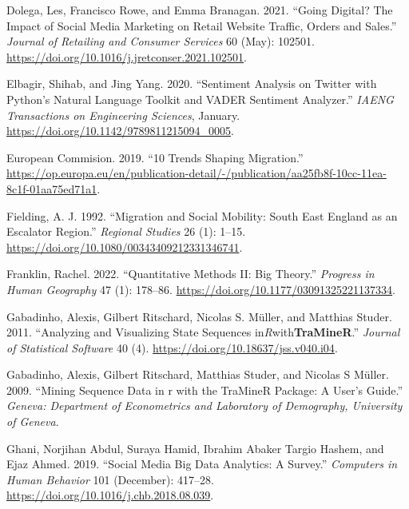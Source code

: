 \documentclass[
  letterpaper,
  DIV=11,
  numbers=noendperiod]{scrreprt}
\newlength{\cslhangindent}
\newlength{\cslentryspacingunit} %
\newenvironment{CSLReferences}[2] %
 {%
  \setlength{\parindent}{0pt}
  \ifodd #1
  \let\oldpar\par
  \def\par{\hangindent=\cslhangindent\oldpar}
  \fi
  \setlength{\parskip}{#2\cslentryspacingunit}
 }%
 {}
\begin{document}
\begin{CSLReferences}{1}{0}
\leavevmode{}%
Dolega, Les, Francisco Rowe, and Emma Branagan. 2021. {``Going Digital?
The Impact of Social Media Marketing on Retail Website Traffic, Orders
and Sales.''} \emph{Journal of Retailing and Consumer Services} 60
(May): 102501. \url{https://doi.org/10.1016/j.jretconser.2021.102501}.

\leavevmode{}%
Elbagir, Shihab, and Jing Yang. 2020. {``Sentiment Analysis on Twitter
with Python{'}s Natural Language Toolkit and VADER Sentiment
Analyzer.''} \emph{IAENG Transactions on Engineering Sciences}, January.
\url{https://doi.org/10.1142/9789811215094_0005}.

\leavevmode{}%
European Commision. 2019. {``{10 Trends Shaping Migration}.''}
\url{https://op.europa.eu/en/publication-detail/-/publication/aa25fb8f-10cc-11ea-8c1f-01aa75ed71a1}.

\leavevmode{}%
Fielding, A. J. 1992. {``Migration and Social Mobility: South East
England as an Escalator Region.''} \emph{Regional Studies} 26 (1):
1--15. \url{https://doi.org/10.1080/00343409212331346741}.

\leavevmode{}%
Franklin, Rachel. 2022. {``Quantitative Methods II: Big Theory.''}
\emph{Progress in Human Geography} 47 (1): 178--86.
\url{https://doi.org/10.1177/03091325221137334}.

\leavevmode{}%
Gabadinho, Alexis, Gilbert Ritschard, Nicolas S. Müller, and Matthias
Studer. 2011. {``Analyzing and Visualizing State Sequences
in{\emph{R}}with{\textbf{TraMineR}}.''} \emph{Journal of Statistical
Software} 40 (4). \url{https://doi.org/10.18637/jss.v040.i04}.

\leavevmode{}%
Gabadinho, Alexis, Gilbert Ritschard, Matthias Studer, and Nicolas S
Müller. 2009. {``Mining Sequence Data in r with the TraMineR Package: A
User's Guide.''} \emph{Geneva: Department of Econometrics and Laboratory
of Demography, University of Geneva}.

\leavevmode{}%
Ghani, Norjihan Abdul, Suraya Hamid, Ibrahim Abaker Targio Hashem, and
Ejaz Ahmed. 2019. {``Social Media Big Data Analytics: A Survey.''}
\emph{Computers in Human Behavior} 101 (December): 417--28.
\url{https://doi.org/10.1016/j.chb.2018.08.039}.


\end{CSLReferences}
\end{document}

